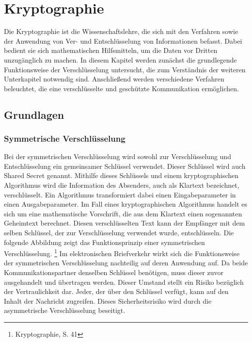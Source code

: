 \documentclass  [paper=a4,
				fontsize=12pt,
				listof=totoc,
				bibliography=totoc
				]{scrreprt}
\begin{document}
	\chapter{Kryptographie}
		Die Kryptographie ist die Wissenschaftslehre, die sich mit den Verfahren sowie der Anwendung von Ver- und Entschlüsselung von Informationen befasst. Dabei bedient sie sich mathematischen Hilfsmitteln, um die Daten vor Dritten unzugänglich zu machen. In diesem Kapitel werden zunächst die grundlegende Funktionsweise der Verschlüsselung untersucht, die zum Verständnis der weiteren Unterkapitel notwendig sind. Anschließend werden verschiedene Verfahren beleuchtet, die eine verschlüsselte und geschützte Kommunikation ermöglichen.
		\section{Grundlagen}
			\subsection{Symmetrische Verschlüsselung}
				Bei der symmetrischen Verschlüsselung wird sowohl zur Verschlüsselung und Entschlüsselung ein gemeinsamer Schlüssel verwendet. Dieser Schlüssel wird auch Shared Secret genannt. Mithilfe dieses Schlüssels und einem kryptographischen Algorithmus wird die Information des Absenders, auch als Klartext bezeichnet, verschlüsselt. Ein Algorithmus transformiert dabei einen Eingabeparameter in einen Ausgabeparameter. Im Fall eines kryptographischen Algorithmus handelt es sich um eine mathematische Vorschrift, die aus dem Klartext einen sogenannten Geheimtext berechnet. Diesen verschlüsselten Text kann der Empfänger mit dem selben Schlüssel, der zur Verschlüsselung verwendet wurde, entschlüsseln. Die folgende Abbildung zeigt das Funktionsprinzip einer symmetrischen Verschlüsselung.
				\footnote{Kryptographie, S. 41}
				Im elektronischen Briefverkehr wirkt sich die Funktionsweise der symmetrischen Verschlüsselung nachteilig auf deren Anwendung auf. Da beide Kommunikationspartner denselben Schlüssel benötigen, muss dieser zuvor ausgehandelt und übertragen werden. Dieser Umstand stellt ein Risiko bezüglich der Vertraulichkeit dar. Jeder, der über den Schlüssel verfügt, kann auf den Inhalt der Nachricht zugreifen. Dieses Sicherheitsrisiko wird durch die asymmetrische Verschlüsselung beseitigt.
\end{document}
